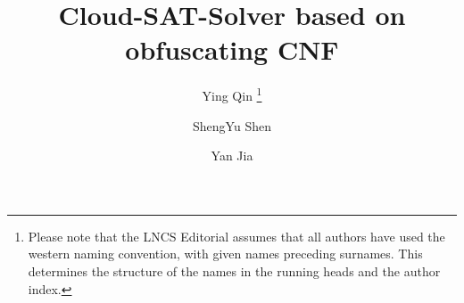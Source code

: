 \documentclass[runningheads,a4paper]{llncs}
\begin{document}
\mainmatter  %

\title{Cloud-SAT-Solver based on obfuscating CNF}


%
%
\author{Ying Qin%
\thanks{Please note that the LNCS Editorial assumes that all authors have used
the western naming convention, with given names preceding surnames. This determines
the structure of the names in the running heads and the author index.}%
\and ShengYu Shen\and Yan Jia}
%


%
%

\maketitle
\end{document}
